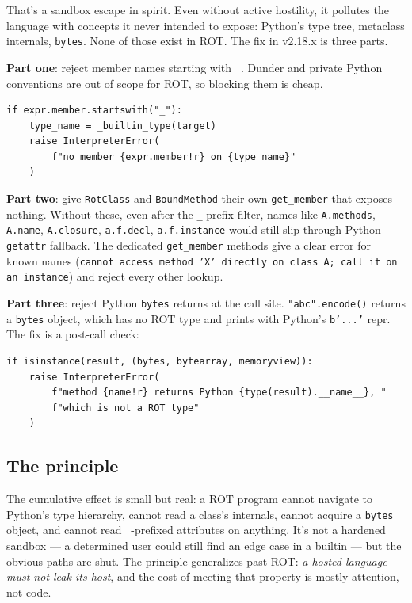 \documentclass[11pt]{article}
\begin{document}
That's a sandbox escape in spirit. Even without active hostility, it pollutes the language with concepts it never intended to expose: Python's type tree, metaclass internals, \texttt{bytes}. None of those exist in ROT. The fix in v2.18.x is three parts.

\textbf{Part one}: reject member names starting with \texttt{\_}. Dunder and private Python conventions are out of scope for ROT, so blocking them is cheap.

\begin{lstlisting}[style=pystyle]
if expr.member.startswith("_"):
    type_name = _builtin_type(target)
    raise InterpreterError(
        f"no member {expr.member!r} on {type_name}"
    )
\end{lstlisting}

\textbf{Part two}: give \texttt{RotClass} and \texttt{BoundMethod} their own \texttt{get\_member} that exposes nothing. Without these, even after the \texttt{\_}-prefix filter, names like \texttt{A.methods}, \texttt{A.name}, \texttt{A.closure}, \texttt{a.f.decl}, \texttt{a.f.instance} would still slip through Python \texttt{getattr} fallback. The dedicated \texttt{get\_member} methods give a clear error for known names (\texttt{cannot access method 'X' directly on class A; call it on an instance}) and reject every other lookup.

\textbf{Part three}: reject Python \texttt{bytes} returns at the call site. \texttt{"abc".encode()} returns a \texttt{bytes} object, which has no ROT type and prints with Python's \texttt{b'...'} repr. The fix is a post-call check:

\begin{lstlisting}[style=pystyle]
if isinstance(result, (bytes, bytearray, memoryview)):
    raise InterpreterError(
        f"method {name!r} returns Python {type(result).__name__}, "
        f"which is not a ROT type"
    )
\end{lstlisting}

\subsection{The principle}

The cumulative effect is small but real: a ROT program cannot navigate to Python's type hierarchy, cannot read a class's internals, cannot acquire a \texttt{bytes} object, and cannot read \texttt{\_}-prefixed attributes on anything. It's not a hardened sandbox --- a determined user could still find an edge case in a builtin --- but the obvious paths are shut. The principle generalizes past ROT: \emph{a hosted language must not leak its host}, and the cost of meeting that property is mostly attention, not code.
\end{document}
